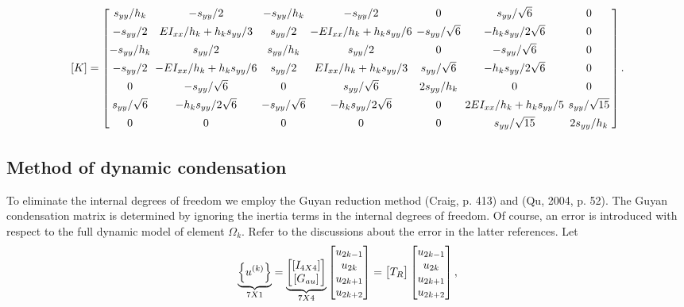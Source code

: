 \documentclass{AeroStructure-ERJohnson}
\begin{document}
\begin{align}\label{eq18.160}
[K]=\left[\arraycolsep=2pt\begin{array}{@{}cccccccc@{}}s_{y y}/h_{k} & -s_{y y}/2 & -s_{y y}/h_{k} & -s_{y y}/2 & 0 & s_{y y}/\sqrt{6} & 0 \\[4pt]-s_{y y}/2 & E I_{x x}/h_{k}+h_{k} s_{y y}/3 & s_{y y}/2 & -E I_{x x}/h_{k}+h_{k} s_{y y}/6 & -s_{y y}/ \sqrt{6} & -h_{k} s_{y y}/2 \sqrt{6} & 0 \\[4pt]-s_{y y}/h_{k} & s_{y y}/2 & s_{y y}/h_{k} & s_{y y}/2 & 0 & -s_{y y}/\sqrt{6} & 0 \\[4pt]-s_{y y}/2 & -E I_{x x}/h_{k}+h_{k} s_{y y}/6 & s_{y y}/2 & E I_{x x}/h_{k}+h_{k} s_{y y}/3 & s_{y y}/\sqrt{6} & -h_{k} s_{y y}/2 \sqrt{6} & 0 \\[4pt]
0 & -s_{y y}/\sqrt{6} & 0 & s_{y y}/\sqrt{6} & 2 s_{y y}/h_{k} & 0 & 0 \\[4pt] s_{y y}/\sqrt{6} & -h_{k} s_{y y}/2 \sqrt{6} & -s_{y y}/\sqrt{6} & -h_{k} s_{y y}/2 \sqrt{6} & 0 & 2 E I_{x x}/h_{k}+h_{k}s_{y y}/5 & s_{y y}/\sqrt{15} \\[4pt]
0 & 0 & 0 & 0 & 0 & s_{y y}/\sqrt{15} & 2 s_{y y}/h_{k}\end{array}\right].
\end{align}

\vspace*{-1pc}

\subsection{Method of dynamic condensation}\label{sec18.8.2}

To\enlargethispage{0\baselineskip} eliminate the internal degrees of freedom we employ the Guyan reduction method (Craig, p. 413) and (Qu, 2004, p. 52). The Guyan condensation matrix is determined by ignoring the inertia terms in the internal degrees of freedom. Of course, an error is introduced with respect to the full dynamic model of element $\Omega_k$. Refer to the discussions about the error in the latter references. Let\vspace*{-0.2pc}
\begin{align}\label{eq18.161}
\underbrace{\left\{u^{(k)}\right\}}_{7 X 1}=\underbrace{\left[\begin{array}{@{}c@{}}{\left[I_{4 X 4}\right]} \\{\left[G_{a u}\right]}\end{array}\right]}_{7 X 4}\left[\begin{array}{@{}c@{}}u_{2 k-1} \\u_{2 k} \\u_{2 k+1} \\u_{2 k+2}\end{array}\right]=\left[\begin{array}{@{}c@{}}T_{R}\end{array}\right]\left[\begin{array}{@{}c@{}}u_{2 k-1} \\u_{2 k} \\u_{2 k+1} \\u_{2 k+2}\end{array}\right],
\end{align}
\end{document}
